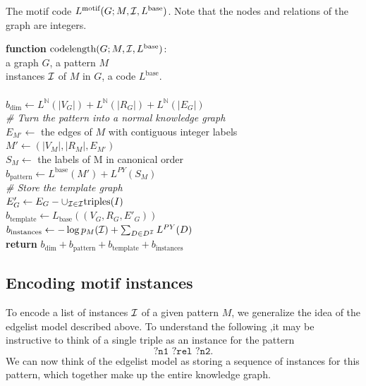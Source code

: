 \documentclass[letterpaper]{article} %
\newcommand{\N}{{\mathbb N}}
\newcommand{\I}{{\cal I}}
\newcommand{\tab}{\hspace*{5mm}}
\begin{document}
\begin{pseudo}[tb]
\caption{The motif code $L^\text{motif}(G ; M, {\cal I}, L^\text{base})$. Note that the nodes and relations of the graph are integers.}
\label{algorithm:motif-code}
{ 
\textbf{function} $\text{codelength}(G; M, {\cal I}, L^\text{base})$:\\
\tab\tab a graph $G$, a pattern $M$\\ 
\tab\tab instances $\cal I$ of $M$ in $G$, a code $L^\text{base}$.\\
\\
$b_\text{dim} \leftarrow L^\N(|V_G|) + L^\N(|R_G|) + L^\N(|E_G|)$ \\

\emph{\# Turn the pattern into a normal knowledge graph}\\
$E_{M'} \leftarrow$ the edges of $M$ with contiguous integer labels \\
$M' \leftarrow (|V_M|, |R_M|, E_{M'})$ \\
$S_M \leftarrow$ the labels of M in canonical order \\
$b_\text{pattern} \leftarrow L^\text{base}(M') + L^{PY}(S_M) $\\

\emph{\# Store the template graph}\\
$E'_G \leftarrow E_G - \cup_{\I \in {\cal I}} \text{triples}(I)$ \\
$b_\text{template} \leftarrow L_\text{base}((V_G, R_G, E'_G))$\\

$b_\text{instances} \leftarrow -\log p_M(\I) + \sum_{D \in D^{\I}} L^{PY}(D)$\\

\textbf{return} $b_\text{dim} + b_\text{pattern} + b_\text{template} + b_\text{instances}$\\
}
\end{pseudo} 

\subsection{Encoding motif instances}

To encode a list of instances $\I$ of a given pattern $M$, we generalize  the idea of the edgelist model described above. To understand the following ,it may be instructive to think of a single triple as an instance for the pattern
\[
\texttt{?n1 ?rel ?n2}.
\]
 We can now think of the edgelist model as storing a sequence of instances for this pattern, which together make up the entire knowledge graph.
 
\end{document}
